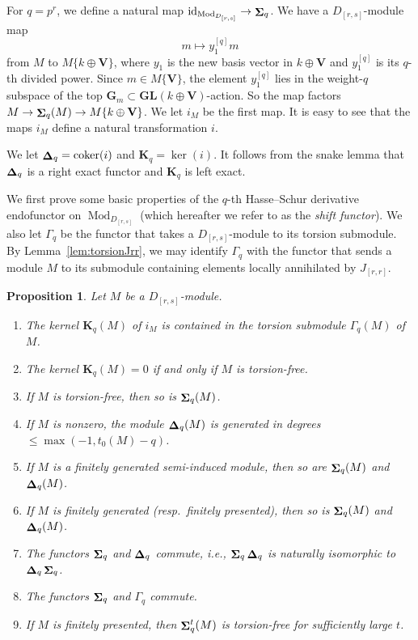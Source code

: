 \documentclass[12pt]{amsart}
\newcommand{\bG}{\mathbf{G}}
\newcommand{\bK}{\mathbf{K}}
\newcommand{\bV}{\mathbf{V}}
\DeclareMathOperator{\coker}{coker}
\DeclareMathOperator{\Mod}{Mod}
\newcommand{\id}{\mathrm{id}}
\DeclareMathOperator{\Sh}{\bf{\Sigma}}
\DeclareMathOperator{\De}{\bf{\Delta}}
\newcommand{\Drs}{D_{[r,s]}}
\newcommand{\Jrr}{J_{[r,r]}}
\newcommand{\mShq}{\Sh_{q}}
\newcommand{\mDeq}{\De_{q}}
\newcommand{\bKq}{{{\bK}_{q}}}
\newcommand{\mKq}{\bKq}
\newcommand{\GL}{\mathbf{GL}}
\newcommand{\mGaq}{\Gamma_{q}}
\numberwithin{equation}{section}
\newtheorem{proposition}[equation]{Proposition}
\theoremstyle{definition}
\theoremstyle{plain}
\begin{document}
For $q = p^r$, we define a natural map $\id_{\Mod_{\Drs}} \to \mShq$.
We have a $\Drs$-module map 
\begin{displaymath}
m \mapsto y_1^{[q]} m
\end{displaymath}
from $M$ to $M\{k \oplus \bV\}$, where $y_1$ is the new basis vector in $k \oplus \bV$ and $y_1^{[q]}$ is its $q$-th divided power. Since $m \in M\{\bV\}$, the element $y_1^{[q]}$ lies in the weight-$q$ subspace of the top $\bG_m \subset \GL(k \oplus \bV)$-action. So the map factors $M \to \mShq(M) \to M\{k \oplus \bV\}$. We let $i_M$ be the first map. It is easy to see that the maps $i_M$ define a natural transformation $i$.

We let $\mDeq = \coker(i)$ and $\mKq = \ker(i)$. It follows from the snake lemma that $\mDeq$ is a right exact functor and $\mKq$ is left exact.

We first prove some basic properties of the $q$-th Hasse--Schur derivative endofunctor on $\Mod_{\Drs}$ (which hereafter we refer to as the \textit{shift functor}). We also let $\mGaq$ be the functor that takes a $\Drs$-module to its torsion submodule. By Lemma~\ref{lem:torsionJrr}, we may identify $\mGaq$ with the functor that sends a module $M$ to its submodule containing elements locally annihilated by $\Jrr$.
\begin{proposition}\label{prop:basicshift}
    Let $M$ be a $\Drs$-module.
    \begin{enumerate}[label=(\alph*), wide=2.1em]
        \item The kernel $\mKq(M)$ of $i_M$ is contained in the torsion submodule $\mGaq(M)$ of $M$.
        \item The kernel $\mKq(M) = 0$ if and only if $M$ is torsion-free.
        \item If $M$ is torsion-free, then so is $\mShq(M)$.
        \item If $M$ is nonzero, the module $\mDeq(M)$ is generated in degrees $\le \max(-1,t_0(M) - q)$.
        \item If $M$ is a finitely generated semi-induced module, then so are $\mShq(M)$ and $\mDeq(M)$.
        \item If $M$ is finitely generated (resp.~finitely presented), then so is $\mShq(M)$ and $\mDeq(M)$.
        \item The functors $\mShq$ and $\mDeq$ commute, i.e., $\mShq \mDeq$ is naturally isomorphic to $\mDeq\mShq$.
        \item The functors $\mShq$ and $\mGaq$ commute.
        \item If $M$ is finitely presented, then $\mShq^t(M)$ is torsion-free for sufficiently large $t$.
    \end{enumerate}
\end{proposition}
\end{document}
